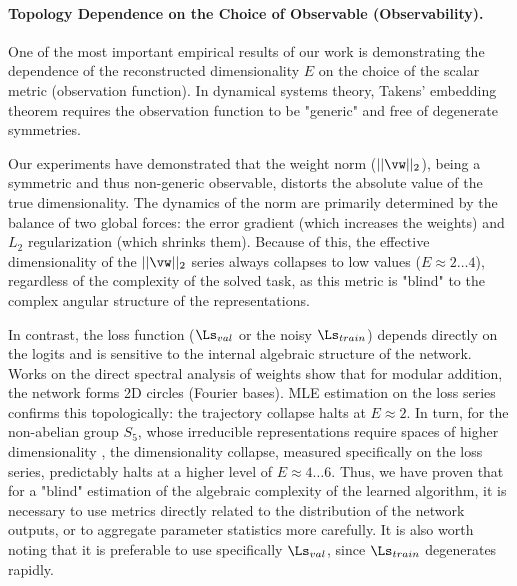 \documentclass{article}
\begin{document}
\paragraph{Topology Dependence on the Choice of Observable (Observability).}
One of the most important empirical results of our work is demonstrating the dependence of the reconstructed dimensionality $E$ on the choice of the scalar metric (observation function). In dynamical systems theory, Takens' embedding theorem requires the observation function to be "generic" and free of degenerate symmetries.

Our experiments have demonstrated that the weight norm ($||\vw||_2$), being a symmetric and thus non-generic observable, distorts the absolute value of the true dimensionality. The dynamics of the norm are primarily determined by the balance of two global forces: the error gradient (which increases the weights) and $L_2$ regularization (which shrinks them). Because of this, the effective dimensionality of the $||\vw||_2$ series always collapses to low values ($E \approx 2\dots 4$), regardless of the complexity of the solved task, as this metric is "blind" to the complex angular structure of the representations.

In contrast, the loss function ($\Ls_{val}$ or the noisy $\Ls_{train}$) depends directly on the logits and is sensitive to the internal algebraic structure of the network. Works on the direct spectral analysis of weights \citep{nanda2023progress} show that for modular addition, the network forms 2D circles (Fourier bases). MLE estimation on the loss series confirms this topologically: the trajectory collapse halts at $E \approx 2$. In turn, for the non-abelian group $S_5$, whose irreducible representations require spaces of higher dimensionality \citep{chughtai2023toy}, the dimensionality collapse, measured specifically on the loss series, predictably halts at a higher level of $E \approx 4\dots 6$. Thus, we have proven that for a "blind" estimation of the algebraic complexity of the learned algorithm, it is necessary to use metrics directly related to the distribution of the network outputs, or to aggregate parameter statistics more carefully. It is also worth noting that it is preferable to use specifically $\Ls_{val}$, since $\Ls_{train}$ degenerates rapidly.
\end{document}
